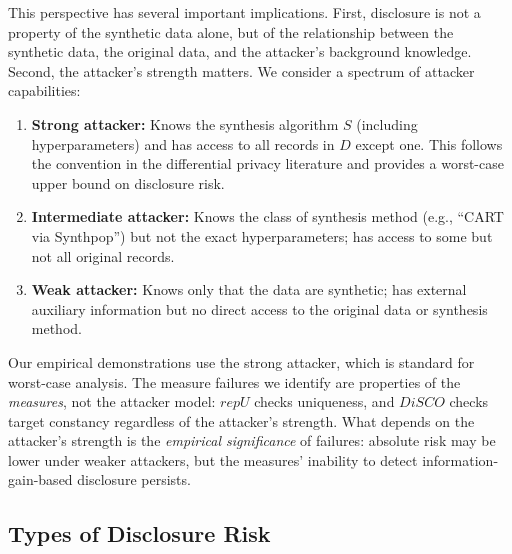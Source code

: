 \documentclass[Afour,sageh,times,doublespace]{sagej}
\begin{document}
This perspective has several important implications. First, disclosure is not a property of the synthetic data alone, but of the relationship between the synthetic data, the original data, and the attacker's background knowledge. Second, the attacker's strength matters. We consider a spectrum of attacker capabilities:


\begin{enumerate}
\item \textbf{Strong attacker:} Knows the synthesis algorithm $S$ (including hyperparameters) and has access to all records in $D$ except one. This follows the convention in the differential privacy literature \citep{Dwork2006} and provides a worst-case upper bound on disclosure risk.
\item \textbf{Intermediate attacker:} Knows the class of synthesis method (e.g., ``CART via Synthpop'') but not the exact hyperparameters; has access to some but not all original records.
\item \textbf{Weak attacker:} Knows only that the data are synthetic; has external auxiliary information but no direct access to the original data or synthesis method.
\end{enumerate}

Our empirical demonstrations use the strong attacker, which is standard for worst-case analysis. The measure failures we identify are properties of the \textit{measures}, not the attacker model: $repU$ checks uniqueness, and $DiSCO$ checks target constancy regardless of the attacker's strength. What depends on the attacker's strength is the \textit{empirical significance} of failures: absolute risk may be lower under weaker attackers, but the measures' inability to detect information-gain-based disclosure persists. 

\subsection{Types of Disclosure Risk}
\end{document}
